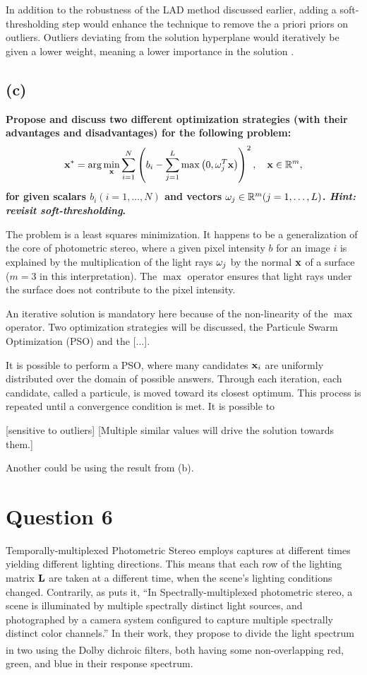 \documentclass{report}
\begin{document}
In addition to the robustness of the LAD method discussed earlier, adding a soft-thresholding step would enhance the technique to remove the a priori priors on outliers. Outliers deviating from the solution hyperplane would iteratively be given a lower weight, meaning a lower importance in the solution .

\subsection{(c)}
\textbf{ Propose and discuss two different optimization strategies (with their advantages and disadvantages) for the following problem:
\begin{equation}
\mathbf{x^*} = \arg \min_{\mathbf{x}} \sum_{i=1}^N \left( b_i - \sum_{j=1}^L \max\left( 0, \omega_j^T\mathbf{x}\right) \right)^2, \quad \mathbf{x} \in \mathbb{R}^m,
\end{equation}
for given scalars $b_i (i = 1, \dots, N)$ and vectors $\mathbf{\omega}_j \in \mathbb{R}^m (j = 1, \dots, L)$. \emph{Hint: revisit soft-thresholding}.}

The problem is a least squares minimization. It happens to be a generalization of the core of photometric stereo, where a given pixel intensity $b$ for an image $i$ is explained by the multiplication of the light rays $\mathbf{\omega}_j$ by the normal $\mathbf{x}$ of a surface ($m = 3$ in this interpretation). The $\max$ operator ensures that light rays under the surface does not contribute to the pixel intensity.

An iterative solution is mandatory here because of the non-linearity of the $\max$ operator. Two optimization strategies will be discussed, the Particule Swarm Optimization (PSO) and the [...].

It is possible to perform a PSO, where many candidates $\mathbf{x}_i$ are uniformly distributed over the domain of possible answers. Through each iteration, each candidate, called a particule, is moved toward its closest optimum. This process is repeated until a convergence condition is met. It is possible to

[sensitive to outliers] [Multiple similar values will drive the solution towards them.]

Another could be using the result from (b).

\section{Question 6}

Temporally-multiplexed Photometric Stereo employs captures at different times yielding different lighting directions. This means that each row of the lighting matrix $\mathbf{L}$ are taken at a different time, when the scene's lighting conditions changed. Contrarily, as \cite{Fyffe2011} puts it, ``In Spectrally-multiplexed photometric stereo, a scene is illuminated by multiple spectrally distinct light sources, and photographed by a camera system configured to capture multiple spectrally distinct color channels.'' In their work, they propose to divide the light spectrum in two using the Dolby\textsuperscript{\textregistered} dichroic filters, both having some non-overlapping red, green, and blue in their response spectrum.
\end{document}
